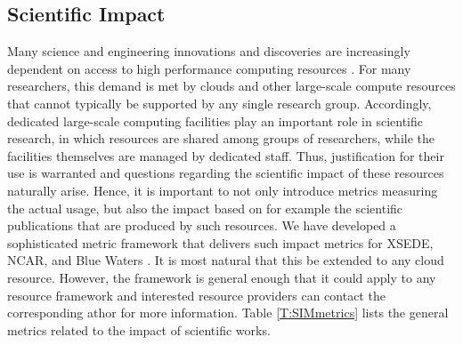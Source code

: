 \documentclass{sig-alternate-05-2015}
\begin{document}

\subsection{Scientific Impact}

Many science and engineering innovations and discoveries are
increasingly dependent on access to high performance computing
resources \cite{las14Impact,las15xsede,las15cluster}. For many
researchers, this demand is met by clouds and other large-scale
compute resources that cannot typically be supported by any single
research group. Accordingly, dedicated large-scale computing
facilities play an important role in scientific research, in which
resources are shared among groups of researchers, while the facilities
themselves are managed by dedicated staff.  Thus, justification for
their use is warranted and questions regarding the scientific impact
of these resources naturally arise. Hence, it is important to not only
introduce metrics measuring the actual usage, but also the impact
based on for example the scientific publications that are produced by
such resources. We have developed a sophisticated metric framework
that delivers such impact metrics for XSEDE, NCAR, and Blue Waters
\cite{las14Impact,las15xsede,las15cluster}. It is most natural that
this be extended to any cloud resource. However, the framework is
general enough that it could apply to any resource framework and
interested resource providers can contact the corresponding athor for
more information. Table \ref{T:SIMmetrics} lists the general metrics
related to the impact of scientific works.
\end{document}
